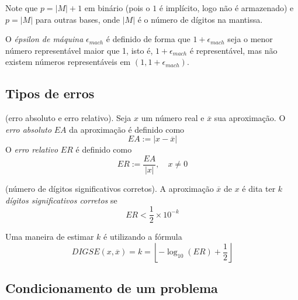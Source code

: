 \documentclass{article}
\begin{document}
\begin{rem}
    Note que \(p = \vert M \vert + 1\) em binário (pois o \(1\) é implícito, logo não é armazenado) e \(p =\vert M \vert\) para outras bases, onde \(\vert M \vert\) é o número de dígitos na mantissa.
\end{rem}

\begin{defn}
    O \emph{épsilon de máquina} \(\epsilon_{mach}\) é definido de forma que \(1+\epsilon_{mach}\) seja o menor número representável maior que 1, isto é, \(1+\epsilon_{mach}\) é representável, mas não existem números representáveis em \((1, 1+\epsilon_{mach})\).
\end{defn}

\subsection{Tipos de erros}

\begin{defn} (erro absoluto e erro relativo).
    Seja \(x\) um número real e \(\overline{x}\) sua aproximação. O \emph{erro absoluto} \(EA\) da aproximação é definido como
    \begin{equation}
        EA := \vert x - \overline{x} \vert
    \end{equation}
    O \emph{erro relativo} \(ER\) é definido como
    \begin{equation}
        ER := \frac{EA}{\vert x \vert}, \quad x \neq 0
    \end{equation}
\end{defn}

\begin{defn} (número de dígitos significativos corretos).
    A aproximação \(\overline{x}\) de \(x\) é dita ter \(k\) \emph{dígitos significativos corretos} se
    \begin{equation}
        ER < \frac{1}{2} \times 10^{-k}
    \end{equation}
\end{defn}

\begin{rem}
    Uma maneira de estimar \(k\) é utilizando a fórmula
    \begin{equation}
        DIGSE(x, \overline{x}) = k = \left\lfloor -\log_{10}(ER) + \frac{1}{2} \right\rfloor
    \end{equation}
\end{rem}

\subsection{Condicionamento de um problema}
\end{document}
